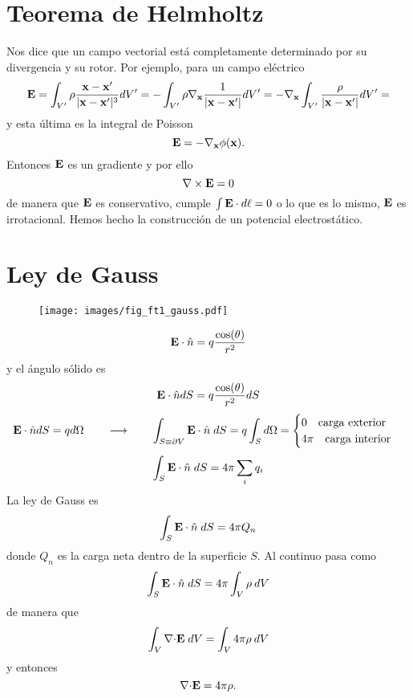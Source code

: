 \documentclass[10pt,oneside]{CBFT_book}
\begin{document}
\section{Teorema de Helmholtz}

Nos dice que un campo vectorial está completamente determinado por su divergencia y su rotor.
Por ejemplo, para un campo eléctrico 
\[
	\vb{E} = \int_{V'} \rho \frac{\vb{x} - \vb{x}'}{|\vb{x} - \vb{x}'|^3} dV' = 
		- \int_{V'} \rho \nabla_{\vb{x}} \frac{ 1 }{|\vb{x} - \vb{x}'|} dV' = 
		- \nabla_{\vb{x}} \int_{V'}   \frac{ \rho }{|\vb{x} - \vb{x}'|} dV' = 
\]
y esta última es la integral de Poisson
\[
	\vb{E} = - \nabla_{\vb{x}} \phi (\vb{x}).
\]
Entonces $\vb{E}$ es un gradiente y por ello 
\[
	\nabla  \times \vb{E} = 0
\]
de manera que $\vb{E}$ es conservativo, cumple $\int \vb{E}\cdot d\vb{\ell} = 0$ o lo que
es lo mismo, $\vb{E}$ es irrotacional.
Hemos hecho la construcción de un potencial electrostático.

\section{Ley de Gauss}



\begin{figure}[htb]
	\begin{center}
	\texttt{[image: images/fig\_ft1\_gauss.pdf]}	 
	\end{center}
	\caption{}
\end{figure} 
\[
	\vb{E} \cdot \hat{n} = q \frac{\cos(\theta)}{r^2}
\]
y el ángulo sólido es
\[
	\vb{E} \cdot \hat{n} dS = q \frac{\cos(\theta)}{r^2} dS
\]
\[
	\vb{E} \cdot \hat{n} dS = q d\Omega \qquad \longrightarrow \qquad 
	\int_{S\equiv\partial V} \vb{E} \cdot \hat{n} \; dS = q \int_S d\Omega =
	\begin{cases}
	 0 \quad \textrm{carga exterior}\\
	 4\pi \quad \textrm{carga interior}
	\end{cases}
\]
\[
	\int_S \vb{E} \cdot \hat{n} \; dS = 4\pi \sum_i q_i
\]
La ley de Gauss es
\[
	\int_S \vb{E} \cdot \hat{n} \; dS = 4\pi Q_n
\]
donde $Q_n$ es la carga neta dentro de la superficie $S$. Al continuo pasa como 
\[
	\int_S \vb{E} \cdot \hat{n} \; dS = 4\pi \int_V \rho \: dV
\]
de manera que 
\[
	\int_V \mathbf{\nabla}\mathbf{\cdot}\mathbf{E} \; dV = \int_V 4\pi \rho \: dV
\]
y entonces
\[
	\mathbf{\nabla}\mathbf{\cdot}\mathbf{E} = 4\pi \rho.
\]
\end{document}
